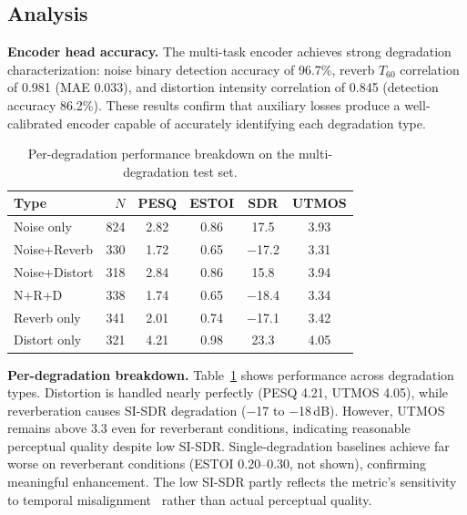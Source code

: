\documentclass[cameraready]{Interspeech}
\begin{document}
\subsection{Analysis}

\textbf{Encoder head accuracy.}
The multi-task encoder achieves strong degradation characterization: noise binary detection accuracy of 96.7\%, reverb $T_{60}$ correlation of 0.981 (MAE 0.033), and distortion intensity correlation of 0.845 (detection accuracy 86.2\%).
These results confirm that auxiliary losses produce a well-calibrated encoder capable of accurately identifying each degradation type.

\begin{table}[!t]
\centering
\caption{Per-degradation performance breakdown on the multi-degradation test set.}
\label{tab:perdeg}
\small
\setlength{\tabcolsep}{3.5pt}
\begin{tabular}{l|r|cccc}
\toprule
Type & $N$ & PESQ & ESTOI & SDR & UTMOS \\
\midrule
Noise only          & 824 & 2.82 & 0.86 & 17.5  & 3.93 \\
Noise+Reverb        & 330 & 1.72 & 0.65 & $-$17.2 & 3.31 \\
Noise+Distort       & 318 & 2.84 & 0.86 & 15.8  & 3.94 \\
N+R+D               & 338 & 1.74 & 0.65 & $-$18.4 & 3.34 \\
Reverb only         & 341 & 2.01 & 0.74 & $-$17.1 & 3.42 \\
Distort only        & 321 & 4.21 & 0.98 & 23.3  & 4.05 \\
\bottomrule
\end{tabular}
\end{table}

\textbf{Per-degradation breakdown.}
Table~\ref{tab:perdeg} shows performance across degradation types.
Distortion is handled nearly perfectly (PESQ 4.21, UTMOS 4.05), while reverberation causes SI-SDR degradation ($-$17 to $-$18\,dB).
However, UTMOS remains above 3.3 even for reverberant conditions, indicating reasonable perceptual quality despite low SI-SDR.
Single-degradation baselines achieve far worse on reverberant conditions (ESTOI 0.20--0.30, not shown), confirming meaningful enhancement.
The low SI-SDR partly reflects the metric's sensitivity to temporal misalignment~\cite{le2019sdr} rather than actual perceptual quality.
\end{document}
